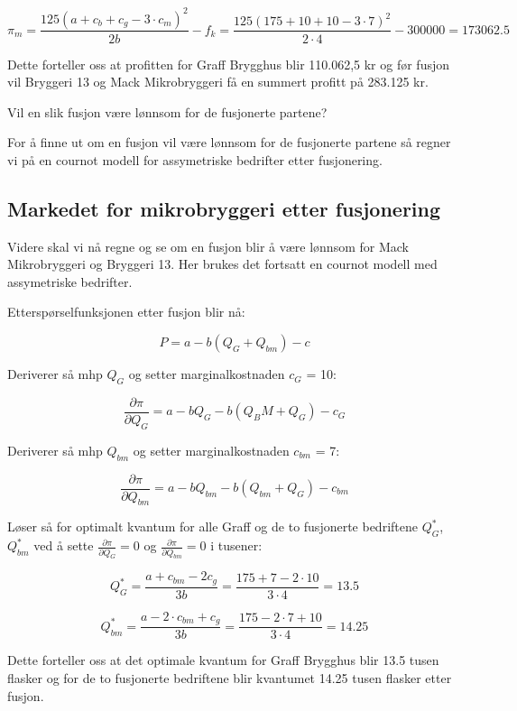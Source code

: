 \documentclass[
  12pt,
  a4paper,
  DIV=11,
  numbers=noendperiod]{scrartcl}
\begin{document}
\[ \pi_m = \frac{125(a+c_b+c_g-3 \cdot c_m)^2}{2b} -f_k = \frac{125(175+10+10-3 \cdot 7)^2}{2 \cdot 4} -300000 = 173062.5 \tag{28}\]

Dette forteller oss at profitten for Graff Brygghus blir 110.062,5 kr og
før fusjon vil Bryggeri 13 og Mack Mikrobryggeri få en summert profitt
på 283.125 kr.

Vil en slik fusjon være lønnsom for de fusjonerte partene?

For å finne ut om en fusjon vil være lønnsom for de fusjonerte partene
så regner vi på en cournot modell for assymetriske bedrifter etter
fusjonering.

\subsection{Markedet for mikrobryggeri etter
fusjonering}\label{markedet-for-mikrobryggeri-etter-fusjonering}

Videre skal vi nå regne og se om en fusjon blir å være lønnsom for Mack
Mikrobryggeri og Bryggeri 13. Her brukes det fortsatt en cournot modell
med assymetriske bedrifter.

Etterspørselfunksjonen etter fusjon blir nå:

\clearpage

\[P = a - b(Q_G+Q_{bm})-c \tag{29}\]

Deriverer så mhp \(Q_{G}\) og setter marginalkostnaden \(c_{G}\) = 10:

\[\frac{\partial \pi}{\partial Q_G} = a - b Q_G - b(Q_BM+Q_G) -c_G \tag{30}\]

Deriverer så mhp \(Q_{bm}\) og setter marginalkostnaden \(c_{bm}\) = 7:

\[\frac{\partial \pi}{\partial Q_{bm}} = a - bQ_{bm} - b(Q_{bm}+Q_G) -c_{bm} \tag{31}\]

Løser så for optimalt kvantum for alle Graff og de to fusjonerte
bedriftene \(Q_G^*\), \(Q_{bm}^*\) ved å sette
\(\frac{\partial \pi}{\partial Q_G} = 0\) og
\(\frac{\partial \pi}{\partial Q_{bm}} = 0\) i tusener:

\[Q_G^* = \frac{a + c_{bm} -2 c_g }{3b} = \frac{175 + 7 -2 \cdot 10}{3 \cdot4} = 13.5 \tag{32}\]

\[Q_{bm}^* = \frac{a -2 \cdot c_{bm}+c_g }{3b} = \frac{175 -2 \cdot 7 + 10}{3 \cdot4} = 14.25 \tag{33}\]

Dette forteller oss at det optimale kvantum for Graff Brygghus blir 13.5
tusen flasker og for de to fusjonerte bedriftene blir kvantumet 14.25
tusen flasker etter fusjon.
\end{document}
